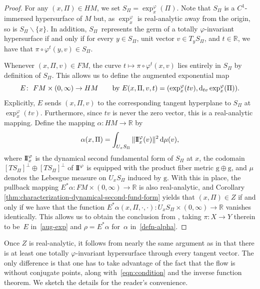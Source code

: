 \documentclass[pdftex]{sigma}
\newcommand{\g}{\mathrm{g}}
\newcommand{\R}{\mathbb{R}}
\numberwithin{equation}{section}
\theoremstyle{definition}
\begin{document}
\begin{proof}
 For any $(x, \Pi) \in HM$, we set $S_\Pi=\exp_x^{\varphi}(\Pi)$. Note that $S_\Pi$ is a $C^1$-immersed hypersurface of $M$ but, as $\exp_x^{\varphi}$ is real-analytic away from the origin, so is $S_\Pi \smallsetminus \{x\}$. In addition, $S_\Pi$~represents the germ of a totally \mbox{$\varphi$-in\-va\-ri\-ant} hypersurface if and only if for every $y \in S_\Pi$, unit vector $v \in T_y S_\Pi$, and $t \in \R$, we have that $\pi \circ \varphi^t(y,v) \in S_\Pi$.

 Whenever $(x, \Pi, v) \in FM$, the curve $t\mapsto \pi\circ \varphi^t(x,v)$ lies entirely in $S_\Pi$ by definition of $S_\Pi$. This allows us to define the augmented exponential map
 \begin{equation}\label{aug-exp} E \colon \ FM \times (0,\infty) \rightarrow HM \qquad \mbox{by } E(x, \Pi, v, t) = (\exp^\varphi_x(tv), {\rm d}_{tv}\exp_x^{\varphi}(\Pi)).\end{equation}
 Explicitly, $E$ sends $(x, \Pi, v)$ to the corresponding tangent hyperplane to $S_\Pi$ at $\exp_x^{\varphi}(tv)$. Furthermore, since $tv$ is never the zero vector, this is a real-analytic mapping. Define the mapping $\alpha\colon HM \to \mathbb{R}$ by
 \begin{equation}\label{defn-alpha}
 \alpha(x,\Pi) = \int_{U_xS_\Pi} \|{\rm I\!I}^\varphi_x(v)\|^2\,{\rm d}\mu(v),
 \end{equation}
 where ${\rm I\!I}_x^\varphi$ is the dynamical second fundamental form of $S_\Pi$ at $x$, the codomain $[TS_\Pi]^\perp \oplus [TS_\Pi]^\perp$ of ${\rm I\!I}^\varphi$ is equipped with the product fiber metric $\g\oplus \g$, and $\mu$ denotes the Lebesgue measure on $U_xS_\Pi$ induced by $\g$. With this in place, the pullback mapping $E^*\alpha \colon FM \times (0,\infty) \rightarrow \mathbb{R}$ is also real-analytic, and Corollary \ref{thm:characterization-dynamical-second-fund-form} yields that $(x,\Pi) \in Z$ if and only if we have that the function $E^*\alpha(x, \Pi, \cdot, \cdot) \colon U_xS_\Pi \times (0,\infty) \rightarrow \mathbb{R}$ vanishes identically. This allows us to obtain the conclusion from \cite[Lemma 3.2.2]{filip2024finiteness}, taking $\pi\colon X\to Y$ therein to be~$E$ in~\eqref{aug-exp} and $\rho = E^*\alpha$ for~$\alpha$ in~\eqref{defn-alpha}.
\end{proof}

Once $Z$ is real-analytic, it follows from nearly the same argument as in \cite[Proposition~3.2.5]{filip2024finiteness} that there is at least one totally $\varphi$-invariant hypersurface through every tangent vector. The only difference is that one has to take advantage of the fact that the flow is without conjugate points, along with~\eqref{eqn:condition} and the inverse function theorem.
We sketch the details for the reader's convenience.
\end{document}
